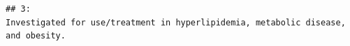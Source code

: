 \documentclass[
]{book}
\begin{document}
\begin{verbatim}
## 3:                                                                                                                                                                                                                                                                                                                                                                                                                                                                                                                                                                                                                                                                                                                                                                                                                                                                                                                                                                                                                                                                                                                                                                                                                                                                                                                                                                                                                                                                                                                                                                                                                                                                                                                                           Investigated for use/treatment in hyperlipidemia, metabolic disease, and obesity.

\end{verbatim}
\end{document}
